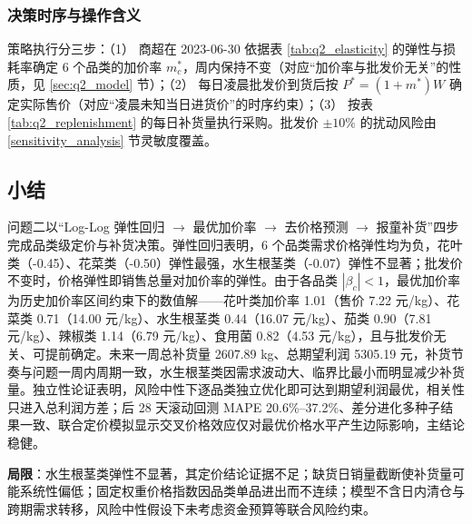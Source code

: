 \subsubsection{决策时序与操作含义}

策略执行分三步：（1） 商超在 2023-06-30 依据表 \ref{tab:q2_elasticity} 的弹性与损耗率确定 6 个品类的加价率 $m^*_c$，周内保持不变（对应“加价率与批发价无关”的性质，见 \ref{sec:q2_model} 节）；（2） 每日凌晨批发价到货后按 $P^*=(1+m^*)W$ 确定实际售价（对应“凌晨未知当日进货价”的时序约束）；（3） 按表 \ref{tab:q2_replenishment} 的每日补货量执行采购。批发价 $\pm10\%$ 的扰动风险由 \ref{sensitivity_analysis} 节灵敏度覆盖。


\subsection{小结}

问题二以“Log-Log 弹性回归 $\to$ 最优加价率 $\to$ 去价格预测 $\to$ 报童补货”四步完成品类级定价与补货决策。弹性回归表明，6 个品类需求价格弹性均为负，花叶类（-0.45）、花菜类（-0.50）弹性最强，水生根茎类（-0.07）弹性不显著；批发价不变时，价格弹性即销售总量对加价率的弹性。由于各品类 $|\beta_c|<1$，最优加价率为历史加价率区间约束下的数值解——花叶类加价率 1.01（售价 7.22 元/kg）、花菜类 0.71（14.00 元/kg）、水生根茎类 0.44（16.07 元/kg）、茄类 0.90（7.81 元/kg）、辣椒类 1.14（6.79 元/kg）、食用菌 0.82（4.53 元/kg），且与批发价无关、可提前确定。未来一周总补货量 2607.89 kg、总期望利润 5305.19 元，补货节奏与问题一周内周期一致，水生根茎类因需求波动大、临界比最小而明显减少补货量。独立性论证表明，风险中性下逐品类独立优化即可达到期望利润最优，相关性只进入总利润方差；后 28 天滚动回测 MAPE 20.6\%–37.2\%、差分进化多种子结果一致、联合定价模拟显示交叉价格效应仅对最优价格水平产生边际影响，主结论稳健。

\textbf{局限}：水生根茎类弹性不显著，其定价结论证据不足；缺货日销量截断使补货量可能系统性偏低；固定权重价格指数因品类单品进出而不连续；模型不含日内清仓与跨期需求转移，风险中性假设下未考虑资金预算等联合风险约束。
